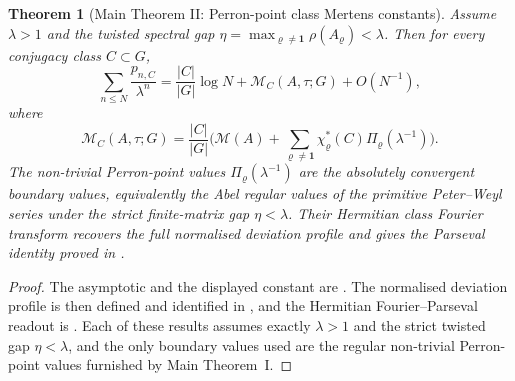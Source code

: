 \documentclass[11pt,a4paper]{amsart}
\theoremstyle{plain}
\newtheorem{theorem}{Theorem}[section]
\theoremstyle{definition}
\theoremstyle{remark}
\begin{document}
\begin{theorem}[Main Theorem II: Perron-point class Mertens constants]
  \label{stmt:main-theorem-ii-class-mertens-constants}
  \label{thm:intro-class-mertens-constants}
  \label{thm:intro-class-mertens}
  Assume \(\lambda>1\) and the twisted spectral gap
  \(\eta=\max_{\varrho\neq\mathbf1}\rho(A_\varrho)<\lambda\).  Then for
  every conjugacy class \(C\subset G\),
  \[
    \sum_{n\le N}\frac{p_{n,C}}{\lambda^n}
    =
    \frac{|C|}{|G|}\log N+\mathcal M_C(A,\tau;G)+O(N^{-1}),
  \]
  where
  \[
    \mathcal M_C(A,\tau;G)=
    \frac{|C|}{|G|}\biggl(\mathcal M(A)+
      \sum_{\varrho\neq\mathbf1}\chi_\varrho^\ast(C)
        \Pi_\varrho(\lambda^{-1})\biggr).
  \]
  The non-trivial Perron-point values
  \(\Pi_\varrho(\lambda^{-1})\) are the absolutely convergent boundary
  values, equivalently the Abel regular values of the primitive
  Peter--Weyl series under the strict finite-matrix gap
  \(\eta<\lambda\).  Their Hermitian class Fourier transform recovers the full
  normalised deviation profile and gives the Parseval identity proved in
  .
\end{theorem}
\begin{proof}
  The asymptotic and the displayed constant are
  .  The normalised deviation profile is then
  defined and identified in , and the
  Hermitian Fourier--Parseval readout is .
  Each of these results assumes exactly \(\lambda>1\) and the strict twisted
  gap \(\eta<\lambda\), and the only boundary values used are the regular
  non-trivial Perron-point values furnished by Main Theorem~I.
\end{proof}
\end{document}
